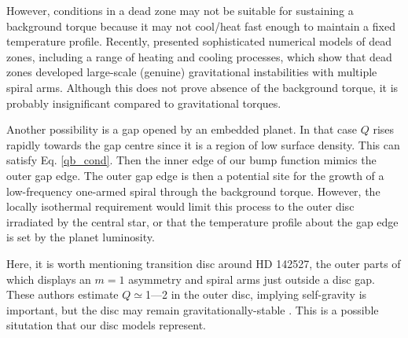 {  However, conditions in a dead zone may not be suitable for 
  sustaining a background torque because it may not cool/heat fast enough
  to maintain a fixed temperature profile. Recently, 
  \cite{bae14} presented sophisticated numerical models of
  dead zones, including a range of heating and 
  cooling processes, which show that dead zones developed large-scale
  (genuine) gravitational instabilities with multiple spiral
  arms. Although this does not prove absence of the background torque,
  it is probably insignificant compared to gravitational torques. 

  Another possibility is a gap opened by an embedded planet. In that case $Q$
  rises rapidly towards the gap centre since it is a region of low
  surface density. This can satisfy Eq. \ref{qb_cond}. Then the inner
  edge of our bump function mimics the outer gap edge. The outer gap
  edge is then a potential site for the growth of a low-frequency
  one-armed spiral through the background torque. However, the
  locally isothermal requirement would limit this process to the
  outer disc irradiated by the central star, or that the temperature
  profile about the gap edge is set by the planet luminosity.  

  Here, it is worth mentioning transition disc 
  around HD 142527, the outer parts of which displays an $m=1$
  asymmetry \citep{fukagawa13} and spiral arms 
  \citep{christiaens14} just outside a disc gap. These authors estimate 
  $Q\simeq$1---2 in the outer disc, implying self-gravity is
  important, but the disc may remain gravitationally-stable
  \citep{christiaens14}. This is a  
  possible situtation that our disc models represent. 
}


